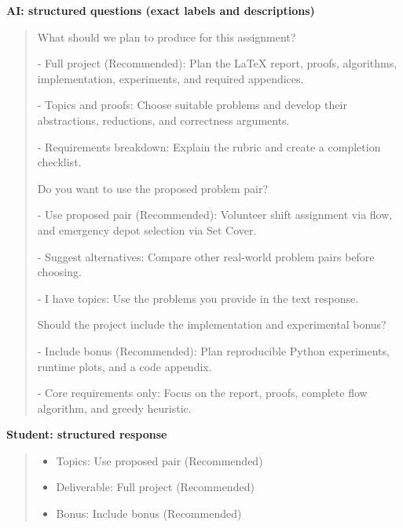 \par\medskip\noindent\textbf{AI: structured questions (exact labels and descriptions)}\par

\begin{quote}\small\raggedright

What should we plan to produce for this assignment?\par
- Full project (Recommended): Plan the LaTeX report, proofs, algorithms, implementation, experiments, and required appendices.\par
- Topics and proofs: Choose suitable problems and develop their abstractions, reductions, and correctness arguments.\par
- Requirements breakdown: Explain the rubric and create a completion checklist.\par
Do you want to use the proposed problem pair?\par
- Use proposed pair (Recommended): Volunteer shift assignment via flow, and emergency depot selection via Set Cover.\par
- Suggest alternatives: Compare other real-world problem pairs before choosing.\par
- I have topics: Use the problems you provide in the text response.\par
Should the project include the implementation and experimental bonus?\par
- Include bonus (Recommended): Plan reproducible Python experiments, runtime plots, and a code appendix.\par
- Core requirements only: Focus on the report, proofs, complete flow algorithm, and greedy heuristic.\par

\end{quote}

\par\medskip\noindent\textbf{Student: structured response}\par

\begin{quote}\small\raggedright

\begin{itemize}
\item Topics: Use proposed pair (Recommended)
\item Deliverable: Full project (Recommended)
\item Bonus: Include bonus (Recommended)
\end{itemize}

\end{quote}


